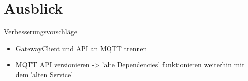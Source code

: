 \chapter{Ausblick}
Verbesserungsvorschläge
\begin{itemize}
	\item
	GatewayClient und API an MQTT trennen
	
	\item
	MQTT API versionieren -> 'alte Dependencies' funktionieren weiterhin mit dem 'alten Service'
\end{itemize}
